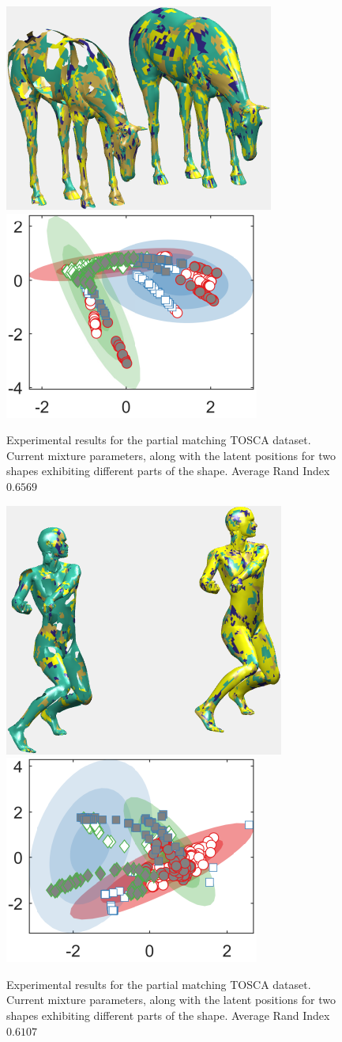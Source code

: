 \documentclass[]{article}
\begin{document}
\begin{figure}[ht!]
	\centering
	
	\includegraphics[width=0.45\linewidth]{img/holesHorse1MVMMexp1}
	\includegraphics[width=0.35\linewidth]{img/holesHorse1MVMMexp3}
	\caption{Experimental results for the partial matching TOSCA dataset.  Current mixture parameters, along with the latent positions for two shapes exhibiting different parts of the shape. Average Rand Index $0.6569$ }
\end{figure}
\begin{figure}[ht!]
	\centering
	
	\includegraphics[width=0.45\linewidth]{img/holesDavid1MVMMexp1}
	\includegraphics[width=0.35\linewidth]{img/holesDavid1MVMMexp3}
	\caption{Experimental results for the partial matching TOSCA dataset.  Current mixture parameters, along with the latent positions for two shapes exhibiting different parts of the shape. Average Rand Index $0.6107$ }
\end{figure}
\end{document}
